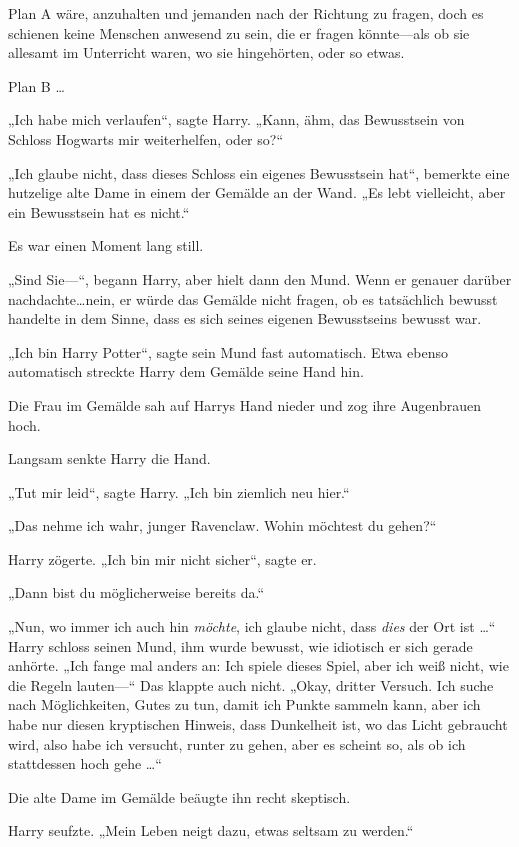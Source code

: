 {Plan A wäre, anzuhalten und jemanden nach der Richtung zu fragen, doch es schienen keine Menschen anwesend zu sein, die er fragen könnte—als ob sie allesamt im Unterricht waren, wo sie hingehörten, oder so etwas.

Plan B …

„Ich habe mich verlaufen“, sagte Harry. „Kann, ähm, das Bewusstsein von Schloss Hogwarts mir weiterhelfen, oder so?“

„Ich glaube nicht, dass dieses Schloss ein eigenes Bewusstsein hat“, bemerkte eine hutzelige alte Dame in einem der Gemälde an der Wand. „Es lebt vielleicht, aber ein Bewusstsein hat es nicht.“

Es war einen Moment lang still.

„Sind Sie—“, begann Harry, aber hielt dann den Mund. Wenn er genauer darüber nachdachte…nein, er würde das Gemälde nicht fragen, ob es tatsächlich bewusst handelte in dem Sinne, dass es sich seines eigenen Bewusstseins bewusst war.

„Ich bin Harry Potter“, sagte sein Mund fast automatisch. Etwa ebenso automatisch streckte Harry dem Gemälde seine Hand hin.

Die Frau im Gemälde sah auf Harrys Hand nieder und zog ihre Augenbrauen hoch.

Langsam senkte Harry die Hand.

„Tut mir leid“, sagte Harry. „Ich bin ziemlich neu hier.“

„Das nehme ich wahr, junger Ravenclaw. Wohin möchtest du gehen?“

Harry zögerte. „Ich bin mir nicht sicher“, sagte er.

„Dann bist du möglicherweise bereits da.“

„Nun, wo immer ich auch hin \emph{möchte}, ich glaube nicht, dass \emph{dies} der Ort ist …“ Harry schloss seinen Mund, ihm wurde bewusst, wie idiotisch er sich gerade anhörte. „Ich fange mal anders an: Ich spiele dieses Spiel, aber ich weiß nicht, wie die Regeln lauten—“ Das klappte auch nicht. „Okay, dritter Versuch. Ich suche nach Möglichkeiten, Gutes zu tun, damit ich Punkte sammeln kann, aber ich habe nur diesen kryptischen Hinweis, dass Dunkelheit ist, wo das Licht gebraucht wird, also habe ich versucht, runter zu gehen, aber es scheint so, als ob ich stattdessen hoch gehe …“

Die alte Dame im Gemälde beäugte ihn recht skeptisch.

Harry seufzte. „Mein Leben neigt dazu, etwas seltsam zu werden.“

}
